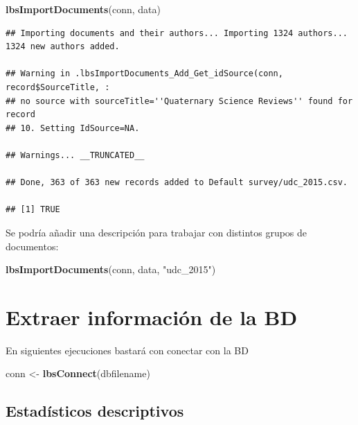 \documentclass[
]{book}
\newenvironment{Shaded}{\begin{snugshade}}{\end{snugshade}}
\newcommand{\KeywordTok}[1]{\textcolor[rgb]{0.13,0.29,0.53}{\textbf{#1}}}
\newcommand{\NormalTok}[1]{#1}
\newcommand{\StringTok}[1]{\textcolor[rgb]{0.31,0.60,0.02}{#1}}
\begin{document}
\begin{Shaded}
\begin{Highlighting}[]
\KeywordTok{lbsImportDocuments}\NormalTok{(conn, data) }
\end{Highlighting}
\end{Shaded}

\begin{verbatim}
## Importing documents and their authors... Importing 1324 authors... 1324 new authors added.

## Warning in .lbsImportDocuments_Add_Get_idSource(conn, record$SourceTitle, :
## no source with sourceTitle=''Quaternary Science Reviews'' found for record
## 10. Setting IdSource=NA.

## Warnings... __TRUNCATED__

## Done, 363 of 363 new records added to Default survey/udc_2015.csv.

## [1] TRUE
\end{verbatim}

Se podría añadir una descripción para trabajar con distintos grupos de documentos:

\begin{Shaded}
\begin{Highlighting}[]
\KeywordTok{lbsImportDocuments}\NormalTok{(conn, data, }\StringTok{"udc_2015"}\NormalTok{) }
\end{Highlighting}
\end{Shaded}

\hypertarget{extraer-informaciuxf3n-de-la-bd}{%
\section{Extraer información de la BD}\label{extraer-informaciuxf3n-de-la-bd}}

En siguientes ejecuciones bastará con conectar con la BD

\begin{Shaded}
\begin{Highlighting}[]
\NormalTok{conn <-}\StringTok{ }\KeywordTok{lbsConnect}\NormalTok{(dbfilename)}
\end{Highlighting}
\end{Shaded}

\hypertarget{estaduxedsticos-descriptivos}{%
\subsection{Estadísticos descriptivos}\label{estaduxedsticos-descriptivos}}
\end{document}
